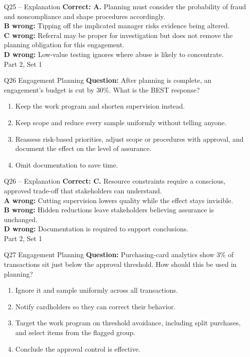\documentclass[aspectratio=169,10pt]{beamer}
\begin{document}
\begin{frame}[t]{Q25 -- Explanation}
	\footnotesize
	\textbf{Correct: A.} Planning must consider the probability of fraud and noncompliance and shape procedures accordingly. \\[5pt]
\textbf{B wrong:} Tipping off the implicated manager risks evidence being altered. \\[3pt]
\textbf{C wrong:} Referral may be proper for investigation but does not remove the planning obligation for this engagement. \\[3pt]
\textbf{D wrong:} Low-value testing ignores where abuse is likely to concentrate. \\[3pt]
	\vfill {\tiny Part 2, Set 1}
\end{frame}
\begin{frame}[t]{Q26 \hfill {\scriptsize Engagement Planning}}
	\small
	\textbf{Question:} After planning is complete, an engagement's budget is cut by 30\%. What is the BEST response?
	\begin{enumerate}[label=\Alph*.,itemsep=1pt,topsep=3pt]
			\item Keep the work program and shorten supervision instead.
			\item Keep scope and reduce every sample uniformly without telling anyone.
			\item Reassess risk-based priorities, adjust scope or procedures with approval, and document the effect on the level of assurance.
			\item Omit documentation to save time.
	\end{enumerate}
\end{frame}
\begin{frame}[t]{Q26 -- Explanation}
	\footnotesize
	\textbf{Correct: C.} Resource constraints require a conscious, approved trade-off that stakeholders can understand. \\[5pt]
\textbf{A wrong:} Cutting supervision lowers quality while the effect stays invisible. \\[3pt]
\textbf{B wrong:} Hidden reductions leave stakeholders believing assurance is unchanged. \\[3pt]
\textbf{D wrong:} Documentation is required to support conclusions. \\[3pt]
	\vfill {\tiny Part 2, Set 1}
\end{frame}
\begin{frame}[t]{Q27 \hfill {\scriptsize Engagement Planning}}
	\small
	\textbf{Question:} Purchasing-card analytics show 3\% of transactions sit just below the approval threshold. How should this be used in planning?
	\begin{enumerate}[label=\Alph*.,itemsep=1pt,topsep=3pt]
			\item Ignore it and sample uniformly across all transactions.
			\item Notify cardholders so they can correct their behavior.
			\item Target the work program on threshold avoidance, including split purchases, and select items from the flagged group.
			\item Conclude the approval control is effective.
	\end{enumerate}
\end{frame}
\end{document}
